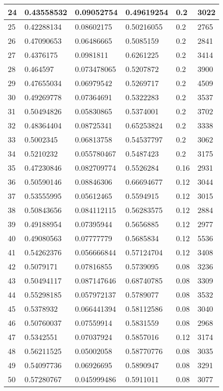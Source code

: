 \begin{longtable}{|l|l|l|l|l|l|}
24 & 0.43558532 & 0.09052754 & 0.49619254 & 0.2 & 3022 \\ \hline 
25 & 0.42288134 & 0.08602175 & 0.50216055 & 0.2 & 2765 \\ \hline 
26 & 0.47090653 & 0.06486665 & 0.5085159 & 0.2 & 2841 \\ \hline 
27 & 0.4376175 & 0.0981811 & 0.6261225 & 0.2 & 3414 \\ \hline 
28 & 0.464597 & 0.073478065 & 0.5207872 & 0.2 & 3900 \\ \hline 
29 & 0.47655034 & 0.06979542 & 0.5269717 & 0.2 & 4509 \\ \hline 
30 & 0.49269778 & 0.07364691 & 0.5322283 & 0.2 & 3537 \\ \hline 
31 & 0.50494826 & 0.05830865 & 0.5374001 & 0.2 & 3702 \\ \hline 
32 & 0.48364404 & 0.08725341 & 0.65253824 & 0.2 & 3338 \\ \hline 
33 & 0.5002345 & 0.06813758 & 0.54537797 & 0.2 & 3062 \\ \hline 
34 & 0.5210232 & 0.055780467 & 0.5487423 & 0.2 & 3175 \\ \hline 
35 & 0.47230846 & 0.082709774 & 0.5526284 & 0.16 & 2931 \\ \hline 
36 & 0.50590146 & 0.08846306 & 0.66694677 & 0.12 & 3044 \\ \hline 
37 & 0.53555995 & 0.05612465 & 0.5594915 & 0.12 & 3015 \\ \hline 
38 & 0.50843656 & 0.084112115 & 0.56283575 & 0.12 & 2884 \\ \hline 
39 & 0.49188954 & 0.07395944 & 0.5656885 & 0.12 & 2977 \\ \hline 
40 & 0.49080563 & 0.07777779 & 0.5685834 & 0.12 & 5536 \\ \hline 
41 & 0.54262376 & 0.056666844 & 0.57124704 & 0.12 & 3408 \\ \hline 
42 & 0.5079171 & 0.07816855 & 0.5739095 & 0.08 & 3236 \\ \hline 
43 & 0.50494117 & 0.087147646 & 0.68740785 & 0.08 & 3309 \\ \hline 
44 & 0.55298185 & 0.057972137 & 0.5789077 & 0.08 & 3532 \\ \hline 
45 & 0.5378932 & 0.066441394 & 0.58112586 & 0.08 & 3040 \\ \hline 
46 & 0.50760037 & 0.07559914 & 0.5831559 & 0.08 & 2968 \\ \hline 
47 & 0.5342551 & 0.07037924 & 0.5857016 & 0.12 & 3174 \\ \hline 
48 & 0.56211525 & 0.05002058 & 0.58770776 & 0.08 & 3035 \\ \hline 
49 & 0.54097736 & 0.06926695 & 0.5890947 & 0.08 & 3291 \\ \hline 
50 & 0.57280767 & 0.045999486 & 0.5911011 & 0.08 & 3077 \\ \hline 
\end{longtable}